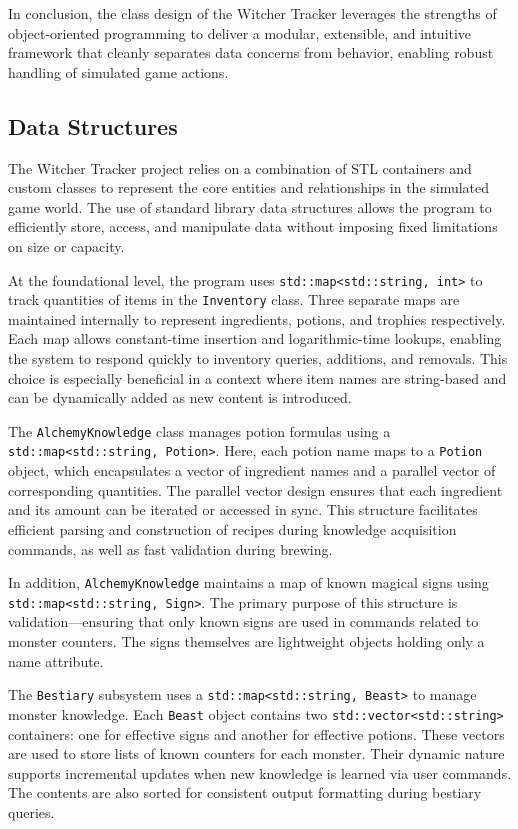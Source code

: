\documentclass{article}
\begin{document}
In conclusion, the class design of the Witcher Tracker leverages the strengths of object-oriented programming to deliver a modular, extensible, and intuitive framework that cleanly separates data concerns from behavior, enabling robust handling of simulated game actions.

\subsection*{Data Structures}

The Witcher Tracker project relies on a combination of STL containers and custom classes to represent the core entities and relationships in the simulated game world. The use of standard library data structures allows the program to efficiently store, access, and manipulate data without imposing fixed limitations on size or capacity.

At the foundational level, the program uses \texttt{std::map<std::string, int>} to track quantities of items in the \texttt{Inventory} class. Three separate maps are maintained internally to represent ingredients, potions, and trophies respectively. Each map allows constant-time insertion and logarithmic-time lookups, enabling the system to respond quickly to inventory queries, additions, and removals. This choice is especially beneficial in a context where item names are string-based and can be dynamically added as new content is introduced.

The \texttt{AlchemyKnowledge} class manages potion formulas using a \texttt{std::map<std::string, Potion>}. Here, each potion name maps to a \texttt{Potion} object, which encapsulates a vector of ingredient names and a parallel vector of corresponding quantities. The parallel vector design ensures that each ingredient and its amount can be iterated or accessed in sync. This structure facilitates efficient parsing and construction of recipes during knowledge acquisition commands, as well as fast validation during brewing.

In addition, \texttt{AlchemyKnowledge} maintains a map of known magical signs using \texttt{std::map<std::string, Sign>}. The primary purpose of this structure is validation—ensuring that only known signs are used in commands related to monster counters. The signs themselves are lightweight objects holding only a name attribute.

The \texttt{Bestiary} subsystem uses a \texttt{std::map<std::string, Beast>} to manage monster knowledge. Each \texttt{Beast} object contains two \texttt{std::vector<std::string>} containers: one for effective signs and another for effective potions. These vectors are used to store lists of known counters for each monster. Their dynamic nature supports incremental updates when new knowledge is learned via user commands. The contents are also sorted for consistent output formatting during bestiary queries.
\end{document}
